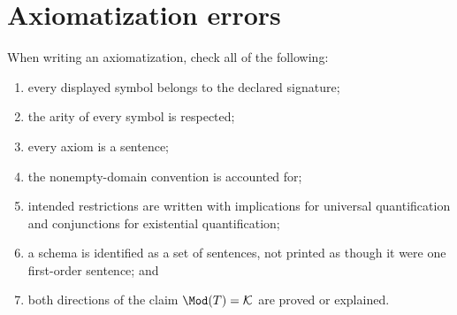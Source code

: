 \section{Axiomatization errors}
\label{sec:fol-theories-01}

\begin{warning}
When writing an axiomatization, check all of the following:
\begin{enumerate}
  \item every displayed symbol belongs to the declared signature;
  \item the arity of every symbol is respected;
  \item every axiom is a sentence;
  \item the nonempty-domain convention is accounted for;
  \item intended restrictions are written with implications for universal
        quantification and conjunctions for existential quantification;
  \item a schema is identified as a set of sentences, not printed as though it
        were one first-order sentence; and
  \item both directions of the claim \(\Mod(T)=\mathcal K\) are proved or
        explained.
\end{enumerate}
\end{warning}

